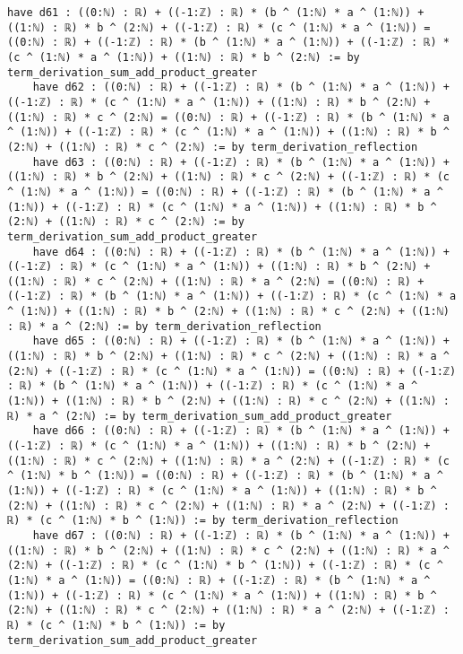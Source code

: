 \documentclass{article}
\begin{document}
\begin{tcolorbox}[colback=white!10, width=\linewidth]
\begin{lstlisting}[language=Lean4]
    have d61 : ((0:ℕ) : ℝ) + ((-1:ℤ) : ℝ) * (b ^ (1:ℕ) * a ^ (1:ℕ)) + ((1:ℕ) : ℝ) * b ^ (2:ℕ) + ((-1:ℤ) : ℝ) * (c ^ (1:ℕ) * a ^ (1:ℕ)) = ((0:ℕ) : ℝ) + ((-1:ℤ) : ℝ) * (b ^ (1:ℕ) * a ^ (1:ℕ)) + ((-1:ℤ) : ℝ) * (c ^ (1:ℕ) * a ^ (1:ℕ)) + ((1:ℕ) : ℝ) * b ^ (2:ℕ) := by term_derivation_sum_add_product_greater
    have d62 : ((0:ℕ) : ℝ) + ((-1:ℤ) : ℝ) * (b ^ (1:ℕ) * a ^ (1:ℕ)) + ((-1:ℤ) : ℝ) * (c ^ (1:ℕ) * a ^ (1:ℕ)) + ((1:ℕ) : ℝ) * b ^ (2:ℕ) + ((1:ℕ) : ℝ) * c ^ (2:ℕ) = ((0:ℕ) : ℝ) + ((-1:ℤ) : ℝ) * (b ^ (1:ℕ) * a ^ (1:ℕ)) + ((-1:ℤ) : ℝ) * (c ^ (1:ℕ) * a ^ (1:ℕ)) + ((1:ℕ) : ℝ) * b ^ (2:ℕ) + ((1:ℕ) : ℝ) * c ^ (2:ℕ) := by term_derivation_reflection
    have d63 : ((0:ℕ) : ℝ) + ((-1:ℤ) : ℝ) * (b ^ (1:ℕ) * a ^ (1:ℕ)) + ((1:ℕ) : ℝ) * b ^ (2:ℕ) + ((1:ℕ) : ℝ) * c ^ (2:ℕ) + ((-1:ℤ) : ℝ) * (c ^ (1:ℕ) * a ^ (1:ℕ)) = ((0:ℕ) : ℝ) + ((-1:ℤ) : ℝ) * (b ^ (1:ℕ) * a ^ (1:ℕ)) + ((-1:ℤ) : ℝ) * (c ^ (1:ℕ) * a ^ (1:ℕ)) + ((1:ℕ) : ℝ) * b ^ (2:ℕ) + ((1:ℕ) : ℝ) * c ^ (2:ℕ) := by term_derivation_sum_add_product_greater
    have d64 : ((0:ℕ) : ℝ) + ((-1:ℤ) : ℝ) * (b ^ (1:ℕ) * a ^ (1:ℕ)) + ((-1:ℤ) : ℝ) * (c ^ (1:ℕ) * a ^ (1:ℕ)) + ((1:ℕ) : ℝ) * b ^ (2:ℕ) + ((1:ℕ) : ℝ) * c ^ (2:ℕ) + ((1:ℕ) : ℝ) * a ^ (2:ℕ) = ((0:ℕ) : ℝ) + ((-1:ℤ) : ℝ) * (b ^ (1:ℕ) * a ^ (1:ℕ)) + ((-1:ℤ) : ℝ) * (c ^ (1:ℕ) * a ^ (1:ℕ)) + ((1:ℕ) : ℝ) * b ^ (2:ℕ) + ((1:ℕ) : ℝ) * c ^ (2:ℕ) + ((1:ℕ) : ℝ) * a ^ (2:ℕ) := by term_derivation_reflection
    have d65 : ((0:ℕ) : ℝ) + ((-1:ℤ) : ℝ) * (b ^ (1:ℕ) * a ^ (1:ℕ)) + ((1:ℕ) : ℝ) * b ^ (2:ℕ) + ((1:ℕ) : ℝ) * c ^ (2:ℕ) + ((1:ℕ) : ℝ) * a ^ (2:ℕ) + ((-1:ℤ) : ℝ) * (c ^ (1:ℕ) * a ^ (1:ℕ)) = ((0:ℕ) : ℝ) + ((-1:ℤ) : ℝ) * (b ^ (1:ℕ) * a ^ (1:ℕ)) + ((-1:ℤ) : ℝ) * (c ^ (1:ℕ) * a ^ (1:ℕ)) + ((1:ℕ) : ℝ) * b ^ (2:ℕ) + ((1:ℕ) : ℝ) * c ^ (2:ℕ) + ((1:ℕ) : ℝ) * a ^ (2:ℕ) := by term_derivation_sum_add_product_greater
    have d66 : ((0:ℕ) : ℝ) + ((-1:ℤ) : ℝ) * (b ^ (1:ℕ) * a ^ (1:ℕ)) + ((-1:ℤ) : ℝ) * (c ^ (1:ℕ) * a ^ (1:ℕ)) + ((1:ℕ) : ℝ) * b ^ (2:ℕ) + ((1:ℕ) : ℝ) * c ^ (2:ℕ) + ((1:ℕ) : ℝ) * a ^ (2:ℕ) + ((-1:ℤ) : ℝ) * (c ^ (1:ℕ) * b ^ (1:ℕ)) = ((0:ℕ) : ℝ) + ((-1:ℤ) : ℝ) * (b ^ (1:ℕ) * a ^ (1:ℕ)) + ((-1:ℤ) : ℝ) * (c ^ (1:ℕ) * a ^ (1:ℕ)) + ((1:ℕ) : ℝ) * b ^ (2:ℕ) + ((1:ℕ) : ℝ) * c ^ (2:ℕ) + ((1:ℕ) : ℝ) * a ^ (2:ℕ) + ((-1:ℤ) : ℝ) * (c ^ (1:ℕ) * b ^ (1:ℕ)) := by term_derivation_reflection
    have d67 : ((0:ℕ) : ℝ) + ((-1:ℤ) : ℝ) * (b ^ (1:ℕ) * a ^ (1:ℕ)) + ((1:ℕ) : ℝ) * b ^ (2:ℕ) + ((1:ℕ) : ℝ) * c ^ (2:ℕ) + ((1:ℕ) : ℝ) * a ^ (2:ℕ) + ((-1:ℤ) : ℝ) * (c ^ (1:ℕ) * b ^ (1:ℕ)) + ((-1:ℤ) : ℝ) * (c ^ (1:ℕ) * a ^ (1:ℕ)) = ((0:ℕ) : ℝ) + ((-1:ℤ) : ℝ) * (b ^ (1:ℕ) * a ^ (1:ℕ)) + ((-1:ℤ) : ℝ) * (c ^ (1:ℕ) * a ^ (1:ℕ)) + ((1:ℕ) : ℝ) * b ^ (2:ℕ) + ((1:ℕ) : ℝ) * c ^ (2:ℕ) + ((1:ℕ) : ℝ) * a ^ (2:ℕ) + ((-1:ℤ) : ℝ) * (c ^ (1:ℕ) * b ^ (1:ℕ)) := by term_derivation_sum_add_product_greater

\end{lstlisting}
\end{tcolorbox}
\end{document}
